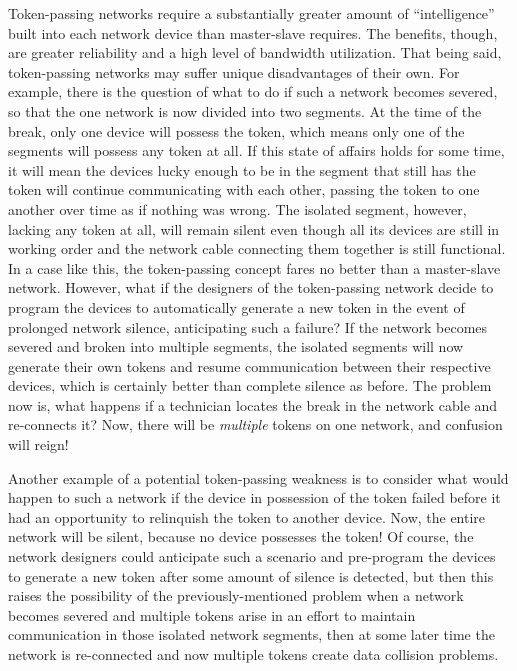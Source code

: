 \vskip 10pt

Token-passing networks require a substantially greater amount of ``intelligence'' built into each network device than master-slave requires.  The benefits, though, are greater reliability and a high level of bandwidth utilization.  That being said, token-passing networks may suffer unique disadvantages of their own.  For example, there is the question of what to do if such a network becomes severed, so that the one network is now divided into two segments.  At the time of the break, only one device will possess the token, which means only one of the segments will possess any token at all.  If this state of affairs holds for some time, it will mean the devices lucky enough to be in the segment that still has the token will continue communicating with each other, passing the token to one another over time as if nothing was wrong.  The isolated segment, however, lacking any token at all, will remain silent even though all its devices are still in working order and the network cable connecting them together is still functional.  In a case like this, the token-passing concept fares no better than a master-slave network.  However, what if the designers of the token-passing network decide to program the devices to automatically generate a new token in the event of prolonged network silence, anticipating such a failure?  If the network becomes severed and broken into multiple segments, the isolated segments will now generate their own tokens and resume communication between their respective devices, which is certainly better than complete silence as before.  The problem now is, what happens if a technician locates the break in the network cable and re-connects it?  Now, there will be \textit{multiple} tokens on one network, and confusion will reign!

Another example of a potential token-passing weakness is to consider what would happen to such a network if the device in possession of the token failed before it had an opportunity to relinquish the token to another device.  Now, the entire network will be silent, because no device possesses the token!  Of course, the network designers could anticipate such a scenario and pre-program the devices to generate a new token after some amount of silence is detected, but then this raises the possibility of the previously-mentioned problem when a network becomes severed and multiple tokens arise in an effort to maintain communication in those isolated network segments, then at some later time the network is re-connected and now multiple tokens create data collision problems.







